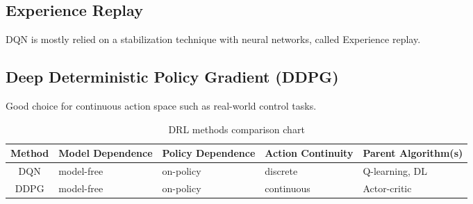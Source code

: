 \documentclass[a4paper,12pt]{article}
\begin{document}


\subsection{Experience Replay}
DQN is mostly relied on a stabilization technique with neural networks, called Experience replay.



\subsection{Deep Deterministic Policy Gradient (DDPG)}
Good choice for continuous action space such as real-world control tasks.

\begin{table}
    \centering
    \begin{tabular}{|c|L|L|L|L|}
        \hline
        \textbf{Method}  &    \textbf{Model Dependence}    &   \textbf{Policy Dependence}   &   \textbf{Action Continuity}  & \textbf{Parent Algorithm(s)}\\
        \hline
        \hline
        DQN &   model-free  &   on-policy   &   discrete    &   Q-learning, DL\\
        \hline
        DDPG    &   model-free  &   on-policy   &   continuous  &   Actor-critic\\
        \hline
    \end{tabular}
    \caption{DRL methods comparison chart}
    \label{tab:dqn vs. ddpg}
\end{table}
\end{document}
